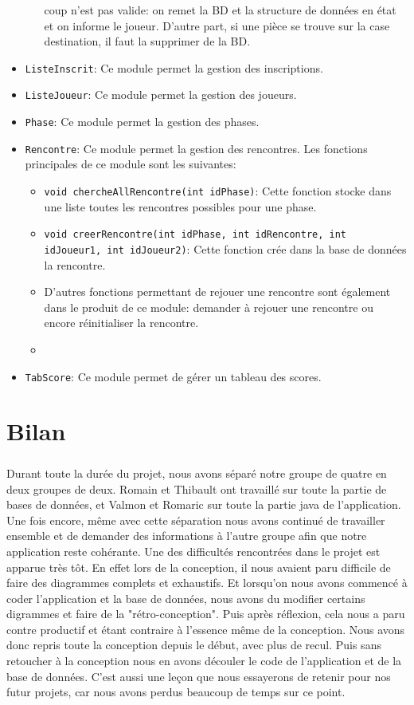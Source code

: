 \documentclass[10pt,a4paper]{report}
\begin{document}
\begin{itemize}
\begin{itemize}
coup n'est pas valide: on remet la BD et la structure de données en
état et on informe le joueur.
D'autre part, si une pièce se trouve sur la case destination, il faut
la supprimer de la BD.\\
\end{itemize}
\item \lstinline!ListeInscrit!: Ce module permet la gestion des inscriptions.
\item \lstinline!ListeJoueur!: Ce module permet la gestion des joueurs.
\item \lstinline!Phase!: Ce module permet la gestion des phases.
\item \lstinline!Rencontre!: Ce module permet la gestion des
  rencontres.
Les fonctions principales de ce module sont les suivantes:
\begin{itemize}
\item \lstinline!void chercheAllRencontre(int idPhase)!: Cette
  fonction stocke dans une liste toutes les rencontres possibles pour
  une phase.
\item \lstinline!void creerRencontre(int idPhase, int idRencontre, int
  idJoueur1, int idJoueur2)!:
Cette fonction crée dans la base de données la rencontre.
\item D'autres fonctions permettant de rejouer une rencontre sont
  également dans le produit de ce module: demander à rejouer une
  rencontre ou encore réinitialiser la rencontre.
\item
\end{itemize}
\item \lstinline!TabScore!:  Ce module permet de gérer un tableau des scores.
\end{itemize}


\chapter{Bilan}
\paragraph{}Durant toute la durée du projet, nous avons séparé notre groupe de quatre en deux groupes de deux. Romain et Thibault ont travaillé sur toute la partie de bases de données, et Valmon et Romaric sur toute la partie java de l'application. Une fois encore, même avec cette séparation nous avons continué de travailler ensemble et de demander des informations à l'autre groupe afin que notre application reste cohérante.
Une des difficultés rencontrées dans le projet est apparue très tôt. En effet lors de la conception, il nous avaient paru difficile de faire des diagrammes complets et exhaustifs. Et lorsqu'on nous avons commencé à coder l'application et la base de données, nous avons du modifier certains digrammes et faire de la "rétro-conception".
Puis après réflexion, cela nous a paru contre productif et étant contraire à l'essence même de la conception. Nous avons donc repris toute la conception depuis le début, avec plus de recul. Puis sans retoucher à la conception nous en avons découler le code de l'application et de la base de données. C'est aussi une leçon que nous essayerons de retenir pour nos futur projets, car nous avons perdus beaucoup de temps sur ce point.
\end{document}
